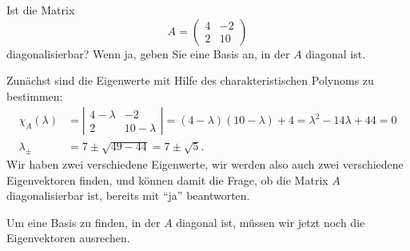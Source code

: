 Ist die Matrix
\[
A=\begin{pmatrix}
4&-2\\
2&10
\end{pmatrix}
\]
diagonalisierbar? Wenn ja, geben Sie eine Basis an, in der $A$ diagonal
ist.

\begin{loesung}
Zunächst sind die Eigenwerte mit Hilfe des charakteristischen Polynoms
zu bestimmen:
\begin{align*}
\chi_A(\lambda)
&=
\left|
\begin{matrix}
4-\lambda&-2\\
2&10-\lambda
\end{matrix}
\right|
=
(4-\lambda)(10-\lambda)+4
=
\lambda^2-14\lambda+44
=0
\\
\lambda_{\pm}
&=
7\pm\sqrt{49-44}=7\pm\sqrt{5}.
\end{align*}
Wir haben zwei verschiedene Eigenwerte, wir werden also auch zwei
verschiedene Eigenvektoren finden, und können damit die Frage, ob 
die Matrix $A$ diagonalisierbar ist, bereits mit ``ja'' beantworten.

Um eine Basis zu finden, in der $A$ diagonal ist, müssen wir jetzt
noch die Eigenvektoren ausrechen.


\end{loesung}
